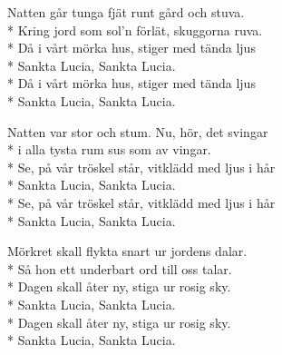\begin{SongText}
    \begin{SongVerse}
        Natten går tunga fjät runt gård och stuva.\\*%
        Kring jord som sol'n förlät, skuggorna ruva.\\*%
        Då i vårt mörka hus, stiger med tända ljus\\*%
        Sankta Lucia, Sankta Lucia.\\*%
        Då i vårt mörka hus, stiger med tända ljus\\*%
        Sankta Lucia, Sankta Lucia.
    \end{SongVerse}
    \begin{SongVerse}
        Natten var stor och stum. Nu, hör, det svingar\\*%
        i alla tysta rum sus som av vingar.\\*%
        Se, på vår tröskel står, vitklädd med ljus i hår\\*%
        Sankta Lucia, Sankta Lucia.\\*%
        Se, på vår tröskel står, vitklädd med ljus i hår\\*%
        Sankta Lucia, Sankta Lucia.
    \end{SongVerse}
    \begin{SongVerse}
        Mörkret skall flykta snart ur jordens dalar.\\*%
        Så hon ett underbart ord till oss talar.\\*%
        Dagen skall åter ny, stiga ur rosig sky.\\*%
        Sankta Lucia, Sankta Lucia.\\*%
        Dagen skall åter ny, stiga ur rosig sky.\\*%
        Sankta Lucia, Sankta Lucia.
    \end{SongVerse}
    \begin{SongVerse}
    \end{SongVerse}
\end{SongText}